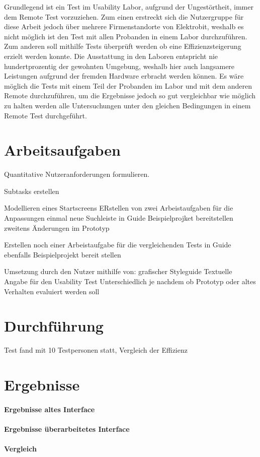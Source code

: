 Grundlegend ist ein Test im Usability Labor, aufgrund der Ungestörtheit, immer dem Remote Test vorzuziehen.
Zum einen erstreckt sich die Nutzergruppe für diese Arbeit  jedoch über mehrere Firmenstandorte von Elektrobit, weshalb es nicht möglich ist den Test mit allen Probanden in einem Labor durchzuführen.
Zum anderen soll mithilfe Tests überprüft werden ob eine Effizienzsteigerung erzielt werden konnte.
Die Ausstattung in den Laboren entspricht nie hundertprozentig der gewohnten Umgebung, weshalb hier auch langsamere Leistungen aufgrund der fremden Hardware erbracht werden können.
Es wäre möglich die Tests mit einem Teil der Probanden im Labor und mit dem anderen Remote durchzuführen, um die Ergebnisse jedoch so gut vergleichbar wie möglich zu halten werden alle Untersuchungen unter den gleichen Bedingungen in einem Remote Test durchgeführt.

\section{Arbeitsaufgaben}

Quantitative Nutzeranforderungen formulieren.

Subtasks erstellen

Modellieren eines Startscreens
ERstellen von zwei Arbeistaufgaben für die Anpassungen
	einmal neue Suchleiste in Guide
		Beispielprojket bereitstellen
	zweitens Änderungen im Prototyp

Erstellen noch einer Arbeistaufgabe für die vergleichenden Tests in Guide
	ebenfalls Beispielprojekt bereit stellen

Umsetzung durch den Nutzer mithilfe von:
	grafischer Styleguide
	Textuelle Angabe für den Usability Test
	Unterschiedlich je nachdem ob Prototyp oder altes Verhalten evaluiert werden soll

\section {Durchführung}
Test fand mit 10 Testpersonen statt, Vergleich der Effizienz \cite{.h}


\section {Ergebnisse}
\paragraph{Ergebnisse altes Interface}
\paragraph{Ergebnisse überarbeitetes Interface}
\paragraph{Vergleich}
